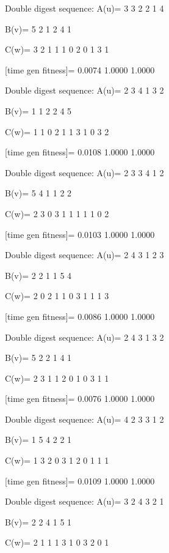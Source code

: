 Double digest sequence:
A(u)=
     3     3     2     2     1     4

B(v)=
     5     2     1     2     4     1

C(w)=
     3     2     1     1     1     0     2     0     1     3     1

[time gen fitness]=
    0.0074    1.0000    1.0000

Double digest sequence:
A(u)=
     2     3     4     1     3     2

B(v)=
     1     1     2     2     4     5

C(w)=
     1     1     0     2     1     1     3     1     0     3     2

[time gen fitness]=
    0.0108    1.0000    1.0000

Double digest sequence:
A(u)=
     2     3     3     4     1     2

B(v)=
     5     4     1     1     2     2

C(w)=
     2     3     0     3     1     1     1     1     1     0     2

[time gen fitness]=
    0.0103    1.0000    1.0000

Double digest sequence:
A(u)=
     2     4     3     1     2     3

B(v)=
     2     2     1     1     5     4

C(w)=
     2     0     2     1     1     0     3     1     1     1     3

[time gen fitness]=
    0.0086    1.0000    1.0000

Double digest sequence:
A(u)=
     2     4     3     1     3     2

B(v)=
     5     2     2     1     4     1

C(w)=
     2     3     1     1     2     0     1     0     3     1     1

[time gen fitness]=
    0.0076    1.0000    1.0000

Double digest sequence:
A(u)=
     4     2     3     3     1     2

B(v)=
     1     5     4     2     2     1

C(w)=
     1     3     2     0     3     1     2     0     1     1     1

[time gen fitness]=
    0.0109    1.0000    1.0000

Double digest sequence:
A(u)=
     3     2     4     3     2     1

B(v)=
     2     2     4     1     5     1

C(w)=
     2     1     1     1     3     1     0     3     2     0     1

